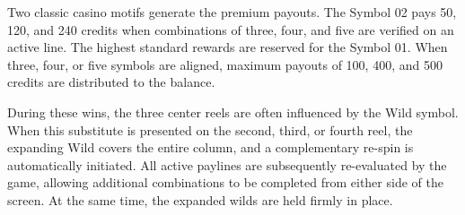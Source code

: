 \documentclass[12pt,twoside,openany]{book}
\begin{document}
Two classic casino motifs generate the premium payouts. The Symbol 02 pays 50, 120, and 240 credits when combinations of three, four, and five are verified on an active line. The highest standard rewards are reserved for the Symbol 01. When three, four, or five symbols are aligned, maximum payouts of 100, 400, and 500 credits are distributed to the balance.

During these wins, the three center reels are often influenced by the Wild symbol. When this substitute is presented on the second, third, or fourth reel, the expanding Wild covers the entire column, and a complementary re-spin is automatically initiated. All active paylines are subsequently re-evaluated by the game, allowing additional combinations to be completed from either side of the screen. At the same time, the expanded wilds are held firmly in place.
\end{document}
